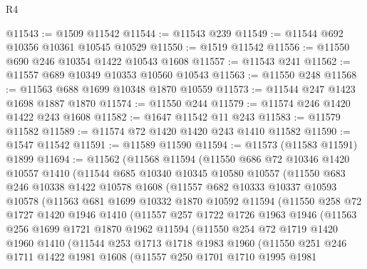 \begin{lexlean}{R4}
\begin{coremodule}
@11543 := @1509 @11542
@11544 := @11543 @239
@11549 := @11544 @692 @10356 @10361 @10545 @10529
@11550 := @1519 @11542
@11556 := @11550 @690 @246 @10354 @1422 @10543 @1608
@11557 := @11543 @241
@11562 := @11557 @689 @10349 @10353 @10560 @10543
@11563 := @11550 @248
@11568 := @11563 @688 @1699 @10348 @1870 @10559
@11573 := @11544 @247 @1423 @1698 @1887 @1870
@11574 := @11550 @244
@11579 := @11574 @246 @1420 @1422 @243 @1608
@11582 := @1647 @11542 @11 @243
@11583 := @11579 @11582
@11589 := @11574 @72 @1420 @1420 @243 @1410 @11582
@11590 := @1547 @11542
@11591 := @11589 @11590
@11594 := @11573 (@11583 @11591) @1899
@11694 := @11562
    (@11568
      @11594
      (@11550
        @686
        @72
        @10346
        @1420
        @10557
        @1410
        (@11544
          @685
          @10340
          @10345
          @10580
          @10557
          (@11550
            @683
            @246
            @10338
            @1422
            @10578
            @1608
            (@11557
              @682
              @10333
              @10337
              @10593
              @10578
              (@11563
                @681
                @1699
                @10332
                @1870
                @10592
                @11594
                (@11550
                  @258
                  @72
                  @1727
                  @1420
                  @1946
                  @1410
                  (@11557
                    @257
                    @1722
                    @1726
                    @1963
                    @1946
                    (@11563
                      @256
                      @1699
                      @1721
                      @1870
                      @1962
                      @11594
                      (@11550
                        @254
                        @72
                        @1719
                        @1420
                        @1960
                        @1410
                        (@11544
                          @253
                          @1713
                          @1718
                          @1983
                          @1960
                          (@11550
                            @251
                            @246
                            @1711
                            @1422
                            @1981
                            @1608
                            (@11557
                              @250
                              @1701
                              @1710
                              @1995
                              @1981

\end{coremodule}
\end{lexlean}
